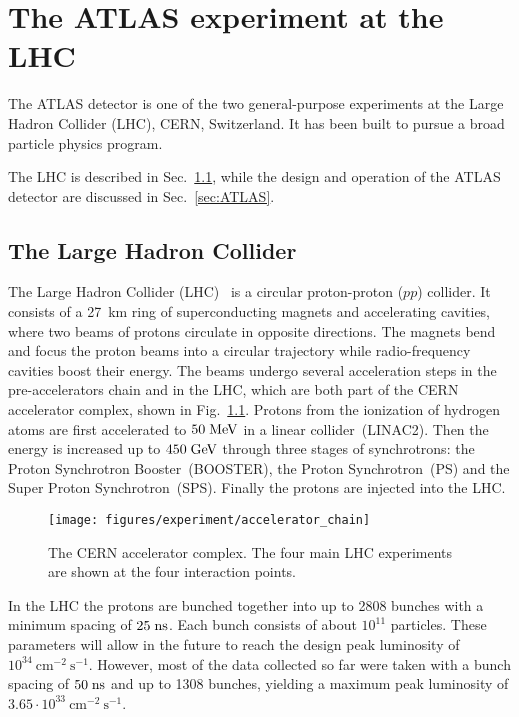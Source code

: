 \chapter{The ATLAS experiment at the LHC}
\label{sec:experiment}

The ATLAS detector is one of the two general-purpose experiments at
the Large Hadron Collider (LHC), CERN, Switzerland.
It has been built to pursue a broad particle physics program. 

The LHC is described in Sec.~\ref{sec:LHC}, while the design and
operation of the ATLAS detector are discussed in
Sec.~\ref{sec:ATLAS}.

\section{The Large Hadron Collider}
\label{sec:LHC}

The Large Hadron Collider (LHC)~\cite{LHCreport} is a circular
proton-proton ($pp$) collider. 
It consists of a 27~km ring of superconducting magnets and
accelerating cavities, where two beams of protons circulate in
opposite directions. 
The magnets bend and focus the proton beams into a circular trajectory
while radio-frequency cavities boost their energy.
The beams undergo several acceleration steps in the pre-accelerators
chain and in the LHC, which are both part of the CERN accelerator
complex, shown in Fig.~\ref{fig:lhc}.
Protons from the ionization of hydrogen atoms are first accelerated to
\mbox{$50 \; \mathrm{MeV}$} in a linear collider~(LINAC2). Then the energy is
increased up to \mbox{$450 \; \mathrm{GeV}$} through three stages of
synchrotrons: the Proton Synchrotron Booster~(BOOSTER), the Proton
Synchrotron~(PS) and the Super Proton Synchrotron~(SPS).
Finally the protons are injected into the LHC.

\begin{figure}[ht]
\begin{center}
\texttt{[image: figures/experiment/accelerator\_chain]}
\caption[CERN Accelerator complex]{
  The CERN accelerator complex. The four main LHC experiments are
  shown at the four interaction points.}
\label{fig:lhc}
\end{center}
\end{figure}

In the LHC the protons are bunched together into up to 2808 bunches 
with a minimum spacing of \mbox{$25 \; \mathrm{ns}$}. 
Each bunch consists of about $10^{11}$ particles. 
These parameters will allow in the future to reach 
the design peak luminosity of \mbox{$10^{34}~\mathrm{cm^{-2}~s^{-1}}$}.
However, most of the data collected so far were taken with a bunch 
spacing of \mbox{$50 \; \mathrm{ns}$} and up to 1308 bunches, yielding a maximum
peak luminosity of \mbox{$3.65\cdot{}10^{33}~\mathrm{cm^{-2}~s^{-1}}$}.

